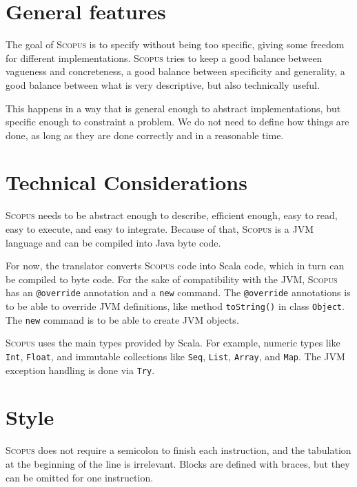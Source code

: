 \documentclass[12pt,a4paper]{book}
\makeatletter
\newcommand{\srccode}[1]{\texttt{{#1}}}
\newcommand{\reservedWord}[1]{{\color{blue}\srccode{#1}}\xspace}
\newcommand{\annotation}[1]{{\color{brown}\srccode{#1}}\xspace}
\newcommand{\snew}{\reservedWord{new}}
\newcommand{\soverride}{\annotation{@override}}
\newcommand{\Scopus}{\textsc{Scopus}\xspace}
\makeatother
\begin{document}
    \section{General features}

    The goal of \Scopus is to specify without being too specific, giving some freedom for different implementations.
    \Scopus tries to keep a good balance between vagueness and concreteness, a good balance between specificity and generality,
    a good balance between what is very descriptive, but also technically useful.

    This happens in a way that is general enough to abstract implementations, but specific enough to constraint a problem.
    We do not need to define how things are done, as long as they are done correctly and in a reasonable time.


    \section{Technical Considerations}

    \Scopus needs to be abstract enough to describe, efficient enough, easy to read, easy to execute, and easy to integrate.
    Because of that, \Scopus is a JVM language and can be compiled into Java byte code.

    For now, the translator converts \Scopus code into Scala code, which in turn can be compiled to byte code.
    For the sake of compatibility with the JVM, \Scopus has an \soverride annotation and a \snew command.
    The \soverride annotations is to be able to override JVM definitions, like method \srccode{toString()} in class \srccode{Object}.
    The \snew command is to be able to create JVM objects.

    \Scopus uses the main types provided by Scala.
    For example, numeric types like \srccode{Int}, \srccode{Float}, and immutable collections like \srccode{Seq}, \srccode{List}, \srccode{Array}, and \srccode{Map}.
    The JVM exception handling is done via \srccode{Try}.


    \section{Style}

    \Scopus does not require a semicolon to finish each instruction, and the tabulation at the beginning of the line is irrelevant.
    Blocks are defined with braces, but they can be omitted for one instruction.
\end{document}
